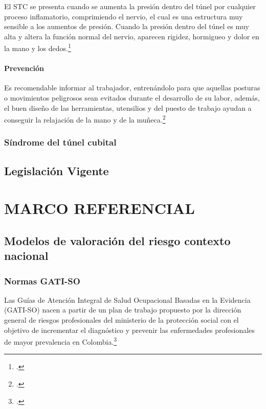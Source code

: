 El STC se presenta cuando se aumenta la presión dentro del túnel por cualquier proceso inflamatorio, comprimiendo el nervio, el cual es una estructura muy sensible a los aumentos de presión. Cuando la presión dentro del túnel es muy alta y altera la función normal del nervio, aparecen rigidez, hormigueo y dolor en la mano y los dedos.\footcite{SindromeCarpiano}
\paragraph{Prevención}
Es recomendable informar al trabajador, entrenándolo para que aquellas posturas o movimientos peligrosos sean evitados durante el desarrollo de su labor, además, el buen diseño de las herramientas, utensilios y del puesto de trabajo ayudan a conseguir la relajación de la mano y de la muñeca.\footcite{SindromeTratarlo}

\subsubsection{Síndrome del túnel cubital}
\subsection{Legislación Vigente}
\section{MARCO REFERENCIAL}
\subsection{Modelos de valoración del riesgo contexto nacional}
\subsubsection{Normas GATI-SO}
Las Guías de Atención Integral de Salud Ocupacional Basadas en la Evidencia (GATI-SO) nacen a partir de un plan de trabajo propuesto por la dirección general de riesgos profesionales del ministerio de la protección social con el objetivo de incrementar el diagnóstico y prevenir las enfermedades profesionales de
mayor prevalencia en Colombia.\footcite[6]{MinisterioQue}

